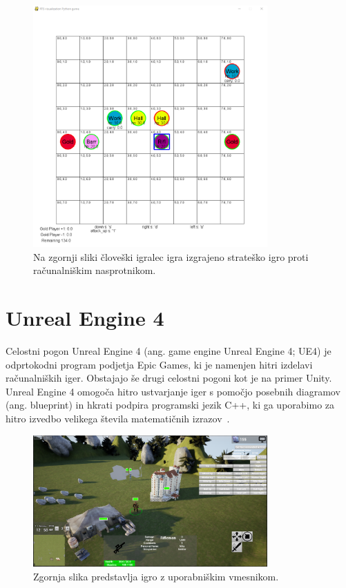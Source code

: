 \documentclass[a4paper, 12pt]{book}
\begin{document}
\begin{figure}[h]
	\begin{center}
		\includegraphics[width=0.8\textwidth]{photos/visualization_pygame.pdf}
	\end{center}
	\caption{Na zgornji sliki človeški igralec igra izgrajeno strateško igro proti računalniškim nasprotnikom.}
	\label{visualization_pygame}
\end{figure}

\section{Unreal Engine 4}
\label{UnrealEngine}

Celostni pogon Unreal Engine 4 (ang. game engine Unreal Engine 4; UE4) je odprtokodni program podjetja Epic Games, ki je namenjen hitri izdelavi računalniških iger. 
Obstajajo še drugi celostni pogoni kot je na primer Unity.\\
Unreal Engine 4 omogoča hitro ustvarjanje iger s pomočjo posebnih diagramov (ang. blueprint) in hkrati podpira programski jezik C++, ki ga uporabimo za hitro izvedbo velikega števila matematičnih izrazov~\cite{diploma2}.

\begin{figure}[h]
	\begin{center}
		\includegraphics[width=0.8\textwidth]{photos/ue4-widget.pdf}
	\end{center}
	\caption{Zgornja slika predstavlja igro z uporabniškim vmesnikom.}
	\label{ue4-game}
\end{figure}
\end{document}
